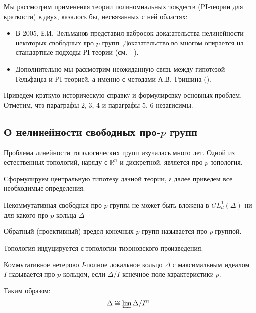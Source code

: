 Мы рассмотрим применения теории полиномиальных тождеств (PI-теории для краткости) в двух, казалось бы, несвязанных с ней областях:
\begin{itemize}
    \item В 2005, Е.И.\ Зельманов представил набросок доказательства нелинейности некоторых свободных про-$p$ групп.
    Доказательство во многом опирается на стандартные подходы PI-теории (см.\ ~\cite{Zelmanov1}).
    \item Дополнительно мы рассмотрим неожиданную связь между гипотезой Гельфанда и PI-теорией, а именно с методами А.В.\ Гришина (\cite{Grishin}).
\end{itemize}

Приведем краткую историческую справку и формулировку основных проблем.
Отметим, что параграфы 2, 3, 4 и параграфы 5, 6 независимы.

\subsection{О нелинейности свободных про-$p$ групп}\label{subsec:introduction-pro-p}
Проблема линейности топологических групп изучалась много лет.
Одной из естественных топологий, наряду с $\mathbb{R}^n$ и дискретной, является про-$p$ топология.

Сформулируем центральную гипотезу данной теории, а далее приведем все необходимые определения:

\vskip 0.1in\noindent
\begin{conjecture}
    Некоммутативная свободная про-$p$ группа не может быть вложена в $GL^1_d(\Delta)$ ни для какого про-$p$ кольца $\Delta$.
\end{conjecture}
\vskip 0.1in\noindent

\vskip 0.1in\noindent
\begin{definition}
    Обратный (проективный) предел конечных $p$-групп называется про-$p$ группой.
\end{definition}
\vskip 0.1in\noindent
Топология индуцируется с топологии тихоновского произведения.

\vskip 0.1in\noindent
\begin{definition}
    Коммутативное нетерово $I$-полное локальное кольцо $\Delta$ с максимальным идеалом $I$ называется про-$p$ кольцом, если $\Delta/I$ конечное поле характеристики $p$.
\end{definition}
\vskip 0.1in\noindent

Таким образом:
\[
    \Delta \cong \varprojlim \Delta/I^n
\]

